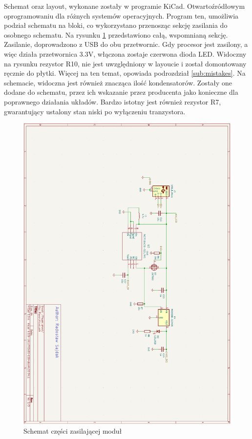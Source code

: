 Schemat oraz layout, wykonane zostały w programie KiCad. Otwartoźródłowym oprogramowaniu dla różnych systemów operacyjnych. Program ten, umożliwia podział schematu na bloki, co wykorzystano przenosząc sekcję zasilania do osobnego schematu. Na rysunku \ref{img:power_sch} przedstawiono całą, wspomnianą sekcję. Zasilanie, doprowadzono z USB do obu przetwornic. Gdy procesor jest zasilony, a więc działa przetwornica 3.3V, włączona zostaje czerwona dioda LED. Widoczny na rysunku rezystor R10, nie jest uwzględniony w layoucie i został domontowany ręcznie do płytki. Więcej na ten temat, opowiada podrozdział \ref{sub:mistakes}.
\newline Na schemacie, widoczna jest również znacząca ilość kondensatorów. Zostały one dodane do schematu, przez  ich wskazanie przez producenta jako konieczne dla poprawnego działania układów. Bardzo istotny jest również rezystor R7, gwarantujący ustalony stan niski po wyłączeniu tranzystora.
\begin{figure}[H]
    \centering
    \includegraphics[width=\textwidth, height=\textheight, keepaspectratio]{Graphics/power_sch.png}
    \caption{Schemat części zasilającej moduł}
    \label{img:power_sch}
\end{figure}
